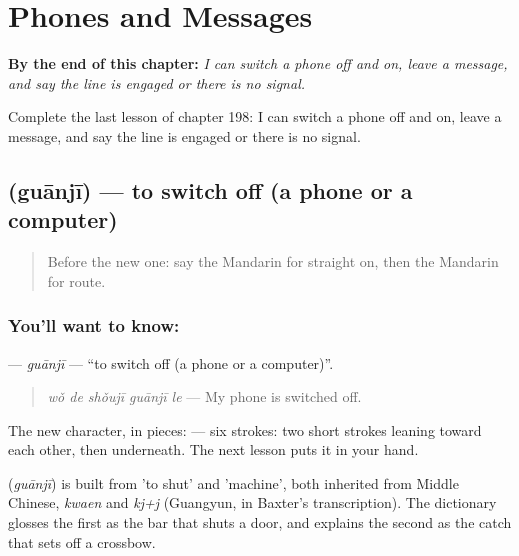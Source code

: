 
\chapter{Phones and Messages}
\label{ch:zh-phones-and-messages}

\begin{chapteropening}
\textbf{By the end of this chapter:} \emph{I can switch a phone off and on, leave a message, and say the line is engaged or there is no signal.}

Complete the last lesson of chapter 198: I can switch a phone off and on, leave a message, and say the line is engaged or there is no signal.
\end{chapteropening}

\section[\texorpdfstring{\zh{关机} (guānjī)}{关机 (guānjī)}]{ (guānjī) — to switch off (a phone or a computer)}

\label{lesson:ZH-C198-guanji}



\begin{quote}
Before the new one: say the Mandarin for straight on, then the Mandarin for route.
\end{quote}

\subsection*{You'll want to know: }
\textbf{} — \emph{guānjī} — \textquotedblleft{}to switch off (a phone or a computer)\textquotedblright{}.

\begin{quote}
\textbf{} \emph{wǒ de shǒujī guānjī le} — My phone is switched off.
\end{quote}

The new character, in pieces:  — six strokes: two short strokes leaning toward each other, then  underneath. The next lesson puts it in your hand.

\begin{cousinweb}
\textbf{} (\emph{guānjī}) is built from  'to shut' and  'machine', both inherited from Middle Chinese, \emph{kwaen} and \emph{kj+j} (Guangyun, in Baxter's transcription). The dictionary glosses the first as the bar that shuts a door, and explains the second as the catch that sets off a crossbow.
\end{cousinweb}

